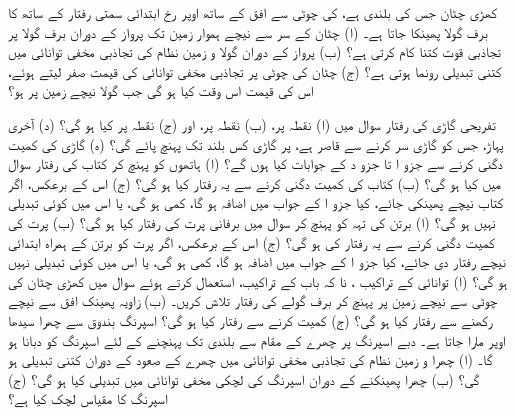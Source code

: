 کھڑی چٹان جس کی بلندی  ہے،   کی چوٹی سے  افق کے ساتھ  اوپر رخ  ابتدائی سمتی رفتار کے ساتھ  کا برف گولا  پھینکا جاتا ہے۔ (ا)  چٹان   کے سر سے نیچے  ہموار زمین تک پرواز کے دوران    برف گولا پر تجاذبی قوت کتنا کام کرتی ہے؟ (ب) پرواز کے دوران گولا و زمین نظام کی تجاذبی مخفی توانائی میں کتنی تبدیلی رونما ہوتی ہے؟ (ج) چٹان کی چوٹی پر  تجاذبی مخفی توانائی کی قیمت صفر لیتے ہوئے، اس کی قیمت اس وقت کیا ہو گی جب گولا نیچے زمین پر ہو؟

تفریحی گاڑی کی رفتار سوال  میں (ا)  نقطہ   پر، (ب)  نقطہ  پر، اور (ج) نقطہ  پر کیا ہو گی؟ (د) آخری پہاڑ، جس کو گاڑی سر کرنے سے قاصر ہے،  پر گاڑی کس بلند تک پہنچ پائے گی؟ (ہ) گاڑی کی کمیت دگنی کرنے سے جزو ا تا جزو د کے جوابات کیا ہوں گے؟
(ا) ہاتھوں کو پہنچ کر کتاب کی رفتار سوال  میں کیا ہو گی؟ (ب)  کتاب کی کمیت دگنی کرنے سے یہ  رفتار کیا ہو گی؟ (ج) اس کے برعکس، اگر کتاب نیچے پھینکی جائے، کیا جزو ا کے  جواب  میں اضافہ ہو گا، کمی ہو گی، یا اس میں کوئی تبدیلی  نہیں ہو گی؟
(ا)  برتن کی تہہ کو پہنچ کر سوال  میں برفانی پرت کی رفتار کیا ہو گی؟ (ب)  پرت کی کمیت دگنی کرنے سے یہ  رفتار  کی ہو گی؟ (ج)  اس کے برعکس، اگر پرت کو برتن کے ہمراہ  ابتدائی  نیچے رفتار  دی جائے، کیا جزو ا کے جواب میں اضافہ ہو گا، کمی ہو گی، یا اس میں کوئی تبدیلی نہیں ہو گی؟
(ا)  توانائی کے تراکیب ، نا کہ باب   کے تراکیب،  استعمال کرتے ہوئے  سوال  میں کھڑی چٹان کی چوٹی سے نیچے زمین پر پہنچ کر  برف گولے کی رفتار تلاش کریں۔ (ب)   زاویہ پھینک  افق سے     نیچے  رکھنے سے رفتار کیا ہو گی؟     (ج)   کمیت  کرنے سے  رفتار کیا ہو گی؟
اسپرنگ بندوق سے  چھرا سیدھا اوپر مارا جاتا ہے۔ دبے اسپرنگ  پر چھرے کے مقام سے  بلندی  تک  پہنچنے کے لئے اسپرنگ کو  دبانا ہو گا۔ (ا)  چھرا و زمین نظام کی تجاذبی مخفی توانائی میں چھرے  کے   صعود  کے دوران کتنی تبدیلی    ہو گی؟ (ب)  چھرا  پھینکنے کے دوران  اسپرنگ کی لچکی مخفی توانائی  میں تبدیلی  کیا ہو گی؟ (ج)  اسپرنگ کا مقیاس لچک کیا ہے؟
